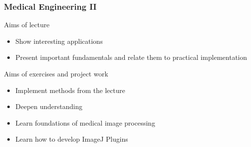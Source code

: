 \begin{frame}
	\frametitle{Medical Engineering II}
	\begin{block}{Aims of lecture}
		\begin{itemize}
			\item Show interesting applications
			\item Present important fundamentals and relate them to practical
			      implementation
		\end{itemize}
	\end{block}
	\begin{block}{Aims of exercises and project work}
		\begin{itemize}
			\item Implement methods from the lecture
			\item Deepen understanding
			\item Learn foundations of medical image processing
			\item Learn how to develop ImageJ Plugins
		\end{itemize}
	\end{block}
\end{frame}

